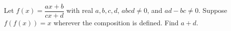 Let $f(x)=\dfrac{ax+b}{cx+d}$ with real $a,b,c,d$, $abcd\ne0$, and $ad-bc\ne0$. Suppose $f(f(x))=x$ wherever the composition is defined. Find $a+d$.
